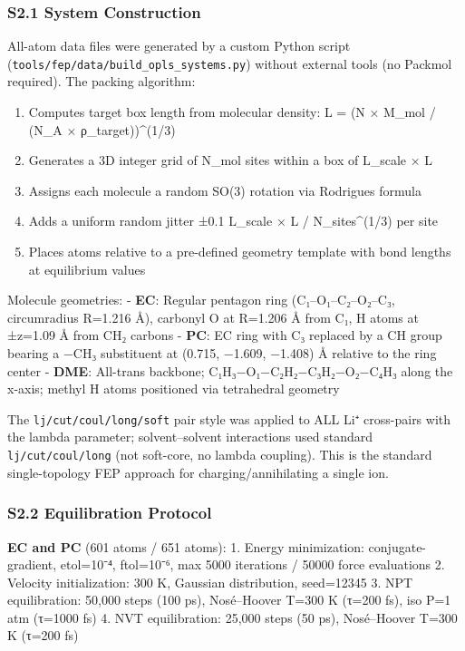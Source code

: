 \documentclass[
  11pt,
]{article}
\providecommand{\tightlist}{%
  \setlength{\itemsep}{0pt}\setlength{\parskip}{0pt}}
\providecommand{\tightlist}{%
  \setlength{\itemsep}{0pt}\setlength{\parskip}{0pt}}
\begin{document}
\subsubsection{S2.1 System Construction}\label{s2.1-system-construction}

All-atom data files were generated by a custom Python script
(\texttt{tools/fep/data/build\_opls\_systems.py}) without external tools
(no Packmol required). The packing algorithm:

\begin{enumerate}
\def\labelenumi{\arabic{enumi}.}
\tightlist
\item
  Computes target box length from molecular density: L = (N × M\_mol /
  (N\_A × ρ\_target))\^{}(1/3)
\item
  Generates a 3D integer grid of N\_mol sites within a box of L\_scale ×
  L
\item
  Assigns each molecule a random SO(3) rotation via Rodrigues formula
\item
  Adds a uniform random jitter ±0.1 L\_scale × L / N\_sites\^{}(1/3) per
  site
\item
  Places atoms relative to a pre-defined geometry template with bond
  lengths at equilibrium values
\end{enumerate}

Molecule geometries: - \textbf{EC}: Regular pentagon ring
(C₁--O₁--C₂--O₂--C₃, circumradius R=1.216 Å), carbonyl O at R=1.206 Å
from C₁, H atoms at ±z=1.09 Å from CH₂ carbons - \textbf{PC}: EC ring
with C₃ replaced by a CH group bearing a −CH₃ substituent at (0.715,
−1.609, −1.408) Å relative to the ring center - \textbf{DME}: All-trans
backbone; C₁H₃−O₁−C₂H₂−C₃H₂−O₂−C₄H₃ along the x-axis; methyl H atoms
positioned via tetrahedral geometry

The \texttt{lj/cut/coul/long/soft} pair style was applied to ALL Li⁺
cross-pairs with the lambda parameter; solvent--solvent interactions
used standard \texttt{lj/cut/coul/long} (not soft-core, no lambda
coupling). This is the standard single-topology FEP approach for
charging/annihilating a single ion.

\subsubsection{S2.2 Equilibration
Protocol}\label{s2.2-equilibration-protocol}

\textbf{EC and PC} (601 atoms / 651 atoms): 1. Energy minimization:
conjugate-gradient, etol=10⁻⁴, ftol=10⁻⁶, max 5000 iterations / 50000
force evaluations 2. Velocity initialization: 300 K, Gaussian
distribution, seed=12345 3. NPT equilibration: 50,000 steps (100 ps),
Nosé--Hoover T=300 K (τ=200 fs), iso P=1 atm (τ=1000 fs) 4. NVT
equilibration: 25,000 steps (50 ps), Nosé--Hoover T=300 K (τ=200 fs)
\end{document}
